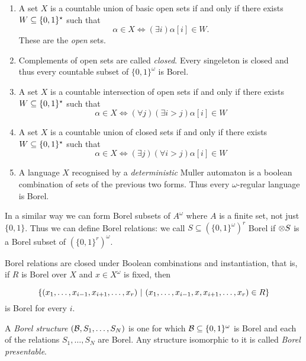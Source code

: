 \begin{example}
\begin{enumerate}
 \item A set $X$ is a  countable union of basic open sets if and only if there exists $W \subseteq \{0,1\}^\star$ such that
\[
 \alpha \in X \iff (\exists i) \alpha[i] \in W.
\]
These are the {\em open} sets. 

\item Complements of open sets are called {\em closed}.  Every singeleton is closed and thus
every countable subset of $\{0,1\}^\omega$ is Borel.

\item A set $X$ is a countable intersection of open sets if and only if there exists $W \subseteq \{0,1\}^\star$ such that
\[
\alpha \in X \iff (\forall j) (\exists i > j)\alpha[i] \in W
\]

\item A set $X$ is a countable union of closed sets if and only if there exists $W \subseteq \{0,1\}^\star$ such that
\[
\alpha \in X \iff (\exists j) (\forall i > j) \alpha[i] \in W
\]
 
\item A language $X$ recognised by a {\em deterministic} Muller automaton is a boolean combination of sets of the previous two forms. Thus 
every $\omega$-regular language is Borel.
\end{enumerate}
\end{example}

In a similar way we can form Borel subsets of $A^\omega$ where $A$ is a finite set, not just $\{0,1\}$.
Thus we can define Borel relations: we call $S \subseteq (\{0,1\}^\omega)^r$ Borel if $\otimes S$ is a Borel subset of $(\{0,1\}^r)^\omega$.

\begin{lemma} \label{AS:lem:Borelclosure}
Borel relations are closed under Boolean combinations and instantiation, that is, if $R$ is Borel over $X$ and $x \in X^\omega$ is fixed, then

\[
\{(x_1,\dots,x_{i-1},x_{i+1},\dots,x_r) \ \vert \  (x_1,\dots,x_{i-1},x,x_{i+1},\dots,x_r) \in R\}
\]
 is Borel for every $i$.
\end{lemma}

\begin{definition} \label{AS:dfn:bap}
A {\em Borel structure} $({\mathcal B},S_1,\dots,S_N)$ is one for which ${\mathcal B} \subseteq \{0,1\}^\omega$ is Borel 
and each of the relations $S_1,\dots, S_N$ are Borel. Any structure isomorphic to it is called {\em Borel presentable}.
\end{definition}

